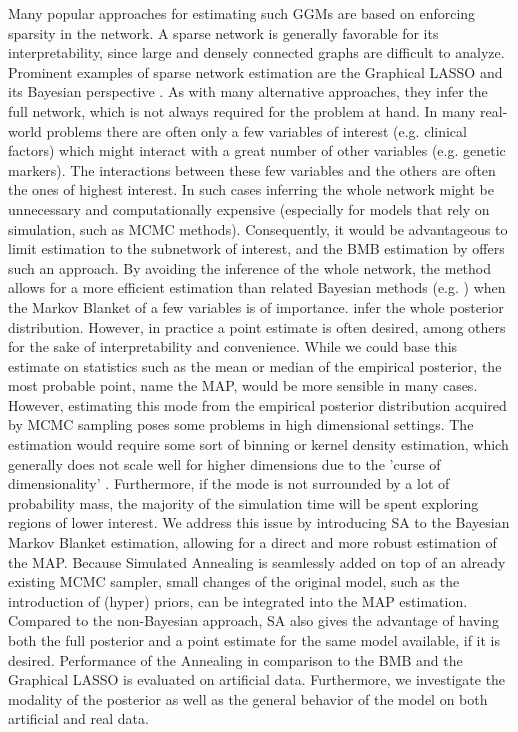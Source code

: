 Many popular approaches for estimating such \gls{GGM}s are based on enforcing sparsity in the network.
A sparse network is generally favorable for its interpretability, since large and densely connected graphs are difficult to analyze.
Prominent examples of sparse network estimation are the Graphical LASSO \cite[]{friedman_sparse_2008} and its Bayesian perspective \cite[]{wang_bayesian_2012}.
As with many alternative approaches, they infer the full network,
which is not always required for the problem at hand.
In many real-world problems there are often only a few variables of interest (e.g. clinical factors) which might interact with a great number of other variables (e.g. genetic markers).
The interactions between these few variables and the others are often the ones of highest interest.
In such cases inferring the whole network might be unnecessary and computationally expensive (especially for models that rely on simulation, such as \gls{MCMC} methods).
Consequently, it would be advantageous to limit estimation to the subnetwork of interest, and the \gls{BMB} estimation by \citet{kaufmann_bayesian_2015} offers such an approach.
By avoiding the inference of the whole network, the method allows for a more efficient estimation than related Bayesian methods (e.g. \citet{wang_bayesian_2012}) when the Markov Blanket of a few variables is of importance.
\citet{kaufmann_bayesian_2015} infer the whole posterior distribution.
However, in practice a point estimate is often desired, among others for the sake of interpretability and convenience.
While we could base this estimate on statistics such as the mean or median of the empirical posterior,
the most probable point, name the \gls{MAP}, would be more sensible in many cases.
However, estimating this mode from the empirical posterior distribution acquired by MCMC sampling poses some problems
in high dimensional settings.
The estimation would require some sort of binning or kernel density estimation,
which generally does not scale well for higher dimensions due to the 'curse of dimensionality' \citep{stone1980optimal, scott1991feasibility}.
Furthermore, if the mode is not surrounded by a lot of probability mass, the majority of the simulation time will be spent exploring regions of lower interest.
We address this issue by introducing \gls{SA} to the Bayesian Markov Blanket estimation, allowing for a direct and more robust estimation of the \gls{MAP}.
Because Simulated Annealing is seamlessly added on top of an already existing MCMC sampler,
small changes of the original model, such as the introduction of (hyper) priors, can be integrated into the MAP estimation.
Compared to the non-Bayesian approach, \gls{SA} also gives the advantage of having both the full posterior and a point estimate for the same model available, if it is desired.
Performance of the Annealing in comparison to the \gls{BMB} and the Graphical LASSO is evaluated on artificial data.
Furthermore, we investigate the modality of the posterior as well as the general behavior of the model
on both artificial and real data.

